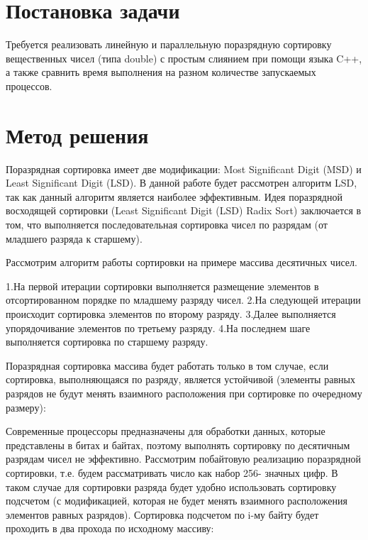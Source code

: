 \documentclass{report}
\begin{document}
\setcounter{page}{2}

\tableofcontents
\newpage

\section*{Постановка задачи}
Требуется реализовать линейную и параллельную поразрядную сортировку вещественных чисел (типа double) с простым слиянием при помощи языка C++, а также сравнить время выполнения на разном количестве запускаемых процессов.
\newpage

\section*{Метод решения}
Поразрядная сортировка имеет две модификации: Most Significant Digit (MSD) и Least Significant Digit (LSD). В данной работе будет рассмотрен алгоритм LSD, так как данный алгоритм является наиболее эффективным. Идея поразрядной восходящей сортировки (Least Significant Digit (LSD) Radix Sort) заключается в том, что выполняется последовательная сортировка чисел по разрядам (от младшего разряда к старшему). 

Рассмотрим алгоритм работы сортировки на примере массива десятичных чисел.



1.На первой итерации сортировки выполняется размещение элементов в отсортированном порядке по младшему разряду чисел.
2.На следующей итерации происходит сортировка элементов по второму разряду.
3.Далее выполняется упорядочивание элементов по третьему разряду.
4.На последнем шаге выполняется сортировка по старшему разряду.

Поразрядная сортировка массива будет работать только в том случае, если
сортировка, выполняющаяся по разряду, является устойчивой (элементы равных разрядов не будут менять взаимного расположения при сортировке по очередному размеру): 



\newpage

Современные процессоры предназначены для обработки данных, которые
представлены в битах и байтах, поэтому выполнять сортировку по десятичным
разрядам чисел не эффективно. Рассмотрим побайтовую реализацию
поразрядной сортировки, т.е. будем рассматривать число как набор 256-
значных цифр. В таком случае для сортировки разряда будет удобно
использовать сортировку подсчетом (с модификацией, которая не будет
менять взаимного расположения элементов равных разрядов).
Сортировка подсчетом по i-му байту будет проходить в два прохода по
исходному массиву:
\end{document}
